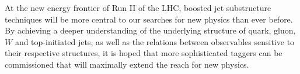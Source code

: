 At the new energy frontier of Run II of the LHC, boosted jet substructure techniques will be more central to our searches for new physics than ever before. By achieving a deeper understanding of the underlying structure of quark, gluon, $W$ and top-initiated jets, as well as the relations between observables sensitive to their respective structures, it is hoped that more sophisticated taggers can be commissioned that will maximally extend the reach for new physics.




